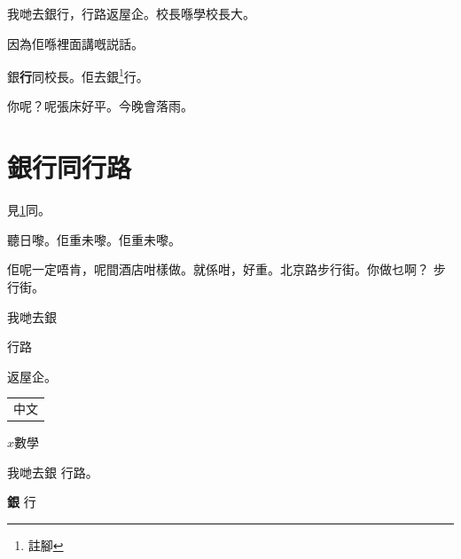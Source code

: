 \documentclass{article}
\newenvironment{lesson}{\begin{jyutpingscope}}{\end{jyutpingscope}}
\newcommand\tab{\begin{tabular}{c}中文\end{tabular}}
\begin{document}
\begin{jyutpingscope}
我哋去銀行，行路返屋企。校長喺學校長大。

因為佢喺裡面講嘅説話。

銀\textbf{行}同校{\color{red}長}。佢去銀\footnote{註腳}行。

你呢？呢張床好平。今晚會落雨。

\section{銀行同行路}\label{sec:a}見\ref{sec:a}同。

聽日嚟。佢重未嚟。佢重未嚟。

佢呢一定唔肯，呢間酒店咁樣做。就係咁，好重。北京路步行街。你做乜啊？
步行街。
\end{jyutpingscope}

\begin{lesson}
我哋去銀\begin{center}行路\end{center}返屋企。\tab $x\mbox{數學}$
\end{lesson}

\begin{jyutpingscope}
我哋去銀
行路。

\textbf{銀}
行
\end{jyutpingscope}
\end{document}
